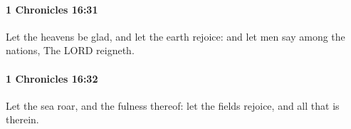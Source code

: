 		\paragraph{1 Chronicles 16:31} %
			\label{1CHRONICLES-16-31}

			Let the heavens be glad, and let the earth rejoice: and let men say among the nations, The LORD reigneth.


		\paragraph{1 Chronicles 16:32} %
			\label{1CHRONICLES-16-32}

			Let the sea roar, and the fulness thereof: let the fields rejoice, and all that is therein.


